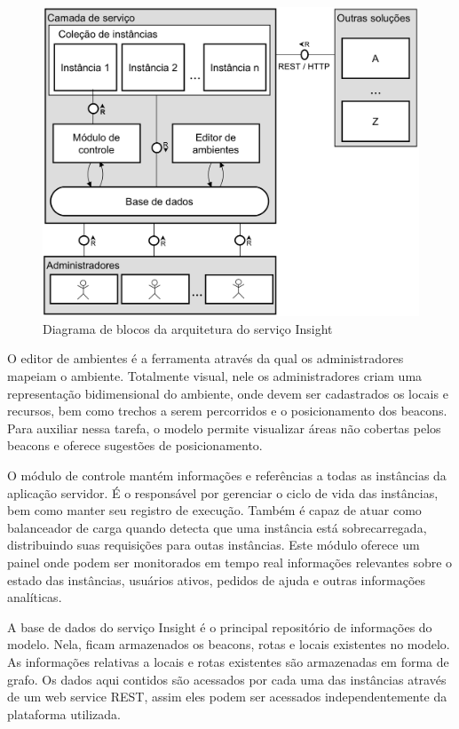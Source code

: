 \documentclass[twoside,english,brazilian]{UNISINOSartigo}
\begin{document}
\begin{figure}[!ht]
	\caption{Diagrama de blocos da arquitetura do serviço Insight}
	\label{fig:arquiteturaServico}
	\centering%
	\begin{minipage}{.6\textwidth}
		\includegraphics[width=\textwidth]{imgs/arquiteturaServico.png}
	\end{minipage}
\end{figure}

O editor de ambientes é a ferramenta através da qual os administradores mapeiam o ambiente. Totalmente visual, nele os administradores criam uma representação bidimensional do ambiente, onde devem ser cadastrados os locais e recursos, bem como trechos a serem percorridos e o posicionamento dos beacons. Para auxiliar nessa tarefa, o modelo permite visualizar áreas não cobertas pelos beacons e oferece sugestões de posicionamento.

O módulo de controle mantém informações e referências a todas as instâncias da aplicação servidor. É o responsável por gerenciar o ciclo de vida das instâncias, bem como manter seu registro de execução. Também é capaz de atuar como balanceador de carga quando detecta que uma instância está sobrecarregada, distribuindo suas requisições para outas instâncias. Este módulo oferece um painel onde podem ser monitorados em tempo real informações relevantes sobre o estado das instâncias, usuários ativos, pedidos de ajuda e outras informações analíticas.

A base de dados do serviço Insight é o principal repositório de informações do modelo. Nela, ficam armazenados os beacons, rotas e locais existentes no modelo. As informações relativas a locais e rotas existentes são armazenadas em forma de grafo. Os dados aqui contidos são acessados por cada uma das instâncias através de um web service REST, assim eles podem ser acessados independentemente da plataforma utilizada.
\end{document}
